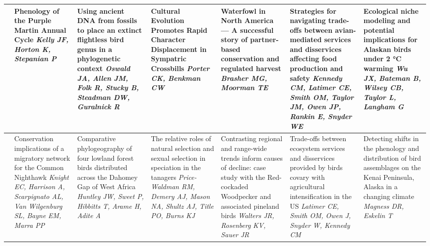 \begin{tabular}{|x{0.75cm}|x{2.25cm}|x{2.25cm}|x{2.25cm}|a{2.25cm}|a{2.25cm}|a{2.25cm}|}
&Phenology of the Purple Martin Annual Cycle \newline \newline \textit{Kelly JF, Horton K, Stepanian P} & Using ancient DNA from fossils to place an extinct flightless bird genus in a phylogenetic context \newline \newline \textit{Oswald JA, Allen JM, Folk R, Stucky B, Steadman DW, Guralnick R} & Cultural Evolution Promotes Rapid Character Displacement in Sympatric Crossbills \newline \newline \textit{Porter CK, Benkman CW} & Waterfowl in North America — A successful story of partner-based conservation and regulated harvest \newline \newline \textit{Brasher MG, Moorman TE} & Strategies for navigating trade-offs between avian-mediated services and disservices affecting food production and safety \newline \newline \textit{Kennedy CM, Latimer CE, Smith OM, Taylor JM, Owen JP, Rankin E, Snyder WE} & Ecological niche modeling and potential implications for Alaskan birds under 2 °C warming \newline \newline \textit{Wu JX, Bateman B, Wilsey CB, Taylor L, Langham G}\\
\hline
{}&Conservation implications of a migratory network for the Common Nighthawk \newline \newline \textit{Knight EC, Harrison A, Scarpignato AL, Van Wilgenburg SL, Bayne EM, Marra PP} & Comparative phylogeography of four lowland forest birds distributed across the Dahomey Gap of West Africa \newline \newline \textit{Huntley JW, Sweet P, Hibbitts T, Arame H, Adite A} & The relative roles of natural selection and sexual selection in speciation in the tanagers \newline \newline \textit{Price-Waldman RM, Demery AJ, Mason NA, Shultz AJ, Title PO, Burns KJ} & Contrasting regional and range-wide trends inform causes of decline: case study with the Red-cockaded Woodpecker and associated pineland birds \newline \newline \textit{Walters JR, Rosenberg KV, Sauer JR} & Trade-offs between ecosystem services and disservices provided by birds covary with agricultural intensification in the US \newline \newline \textit{Latimer CE, Smith OM, Owen J, Snyder W, Kennedy CM} & Detecting shifts in the phenology and distribution of bird assemblages on the Kenai Peninsula, Alaska in a changing climate \newline \newline \textit{Magness DR, Eskelin T}\\

\end{tabular}

